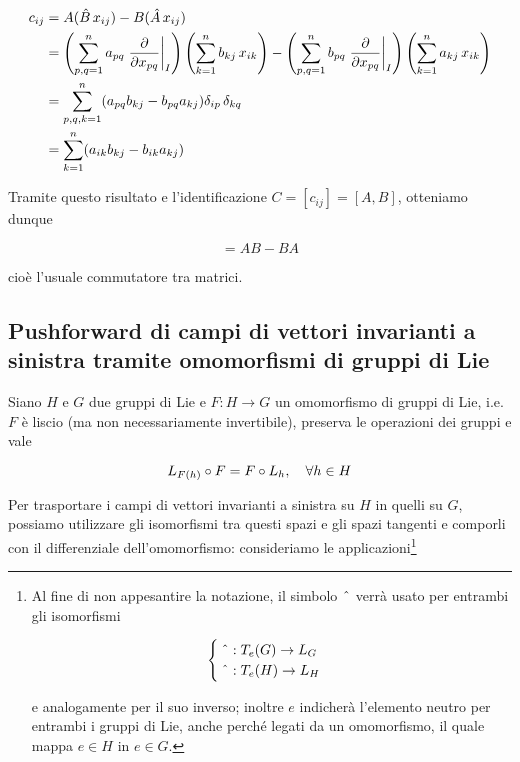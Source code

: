 \begin{align}
	\begin{split}
		c_{ij} &= A (\hat{B} \, x_{ij}) - B (\hat{A} \, x_{ij})\\
		&= \left( \sum_{p,q=1}^{n} a_{pq} \eval{ \pdv{x_{pq}} }_{I} \right) \left( \displaystyle\sum_{k=1}^{n} b_{kj} \, x_{ik} \right) - \left( \sum_{p,q=1}^{n} b_{pq} \eval{ \pdv{x_{pq}} }_{I} \right) \left( \displaystyle\sum_{k=1}^{n} a_{kj} \, x_{ik} \right)\\
		&= \sum_{p,q,k=1}^{n} ( a_{pq} b_{kj} - b_{pq} a_{kj} ) \delta_{ip} \, \delta_{kq}\\
		&= \sum_{k=1}^{n} ( a_{ik} b_{kj} - b_{ik} a_{kj} )
	\end{split}
\end{align}

Tramite questo risultato e l'identificazione $ C = [c_{ij}] = [A,B] $, otteniamo dunque

\begin{equation}
	[A,B] = A B - B A
\end{equation}

cioè l'usuale commutatore tra matrici.

\subsection{Pushforward di campi di vettori invarianti a sinistra tramite omomorfismi di gruppi di Lie}

Siano $ H $ e $ G $ due gruppi di Lie e $ F : H \to G $ un omomorfismo di gruppi di Lie, i.e. $ F $ è liscio (ma non necessariamente invertibile), preserva le operazioni dei gruppi e vale

\begin{equation}
	L_{F(h)} \circ F = F \circ L_{h} \qcomma \forall h \in H
\end{equation}

Per trasportare i campi di vettori invarianti a sinistra su $ H $ in quelli su $ G $, possiamo utilizzare gli isomorfismi tra questi spazi e gli spazi tangenti e comporli con il differenziale dell'omomorfismo: consideriamo le applicazioni\footnote{%
	Al fine di non appesantire la notazione, il simbolo $ \; \hat{} \; $ verrà usato per entrambi gli isomorfismi
	
	\begin{equation*}
		\begin{cases}
			\; \hat{} \; : T_{e}(G) \to L_{G}\\
			\; \hat{} \; : T_{e}(H) \to L_{H}
		\end{cases}
	\end{equation*}
	
	e analogamente per il suo inverso; inoltre $ e $ indicherà l'elemento neutro per entrambi i gruppi di Lie, anche perché legati da un omomorfismo, il quale mappa $ e \in H $ in $ e \in G $.%
}

